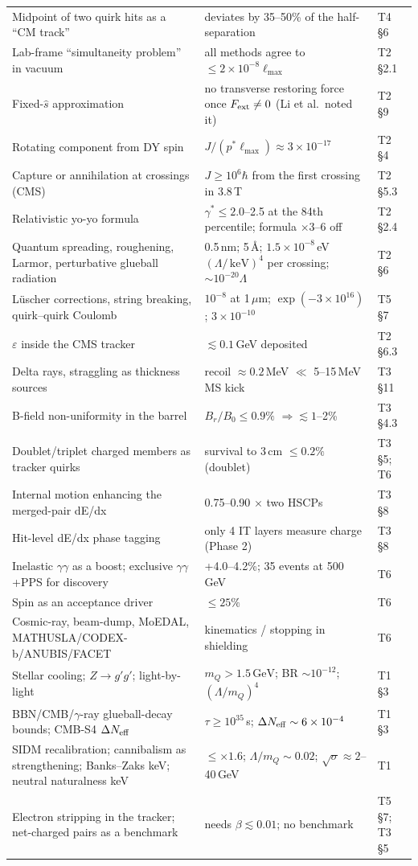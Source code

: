 \documentclass[11pt,a4paper]{article}
\newcommand{\mQ}{m_Q}
\newcommand{\GeV}{\ensuremath{\,\mathrm{GeV}}}
\newcommand{\keV}{\ensuremath{\,\mathrm{keV}}}
\newcommand{\um}{\ensuremath{\,\mu\mathrm{m}}}
\newcommand{\gst}{\gamma^*}
\newcommand{\lmax}{\ell_{\max}}
\newcommand{\sqs}{\sqrt{\sigma}}
\begin{document}
{\begin{longtable}{@{}L{5.6cm}L{7.6cm}L{3.0cm}@{}}
Midpoint of two quirk hits as a ``CM track'' & deviates by 35--50\% of the half-separation & T4 \S6\\
Lab-frame ``simultaneity problem'' in vacuum & all methods agree to $\le2\times10^{-8}\lmax$ & T2 \S2.1\\
Fixed-$\hat s$ approximation & no transverse restoring force once $F_{\rm ext}\ne0$ (Li et al.\ noted it) & T2 \S9\\
Rotating component from DY spin & $J/(p^*\lmax)\approx3\times10^{-17}$ & T2 \S4\\
Capture or annihilation at crossings (CMS) & $J\ge10^6\hbar$ from the first crossing in 3.8\,T & T2 \S5.3\\
Relativistic yo-yo formula & $\gst\le2.0$--2.5 at the 84th percentile; formula $\times3$--6 off & T2 \S2.4\\
Quantum spreading, roughening, Larmor, perturbative glueball radiation & 0.5\,nm; 5\,\AA; $1.5\times10^{-8}$\,eV$(\Lambda/\keV)^4$ per crossing; $\sim10^{-20}\Lambda$ & T2 \S6\\
L\"uscher corrections, string breaking, quirk--quirk Coulomb & $10^{-8}$ at 1\um; $\exp(-3\times10^{16})$; $3\times10^{-10}$ & T5 \S7\\
$\varepsilon$ inside the CMS tracker & $\lesssim0.1$\,GeV deposited & T2 \S6.3\\
Delta rays, straggling as thickness sources & recoil $\approx0.2$\,MeV $\ll$ 5--15\,MeV MS kick & T3 \S11\\
B-field non-uniformity in the barrel & $B_r/B_0\le0.9\%$ $\Rightarrow\lesssim1$--2\% & T3 \S4.3\\
Doublet/triplet charged members as tracker quirks & survival to 3\,cm $\le0.2\%$ (doublet) & T3 \S5; T6\\
Internal motion enhancing the merged-pair dE/dx & 0.75--0.90 $\times$ two HSCPs & T3 \S8\\
Hit-level dE/dx phase tagging & only 4 IT layers measure charge (Phase 2) & T3 \S8\\
Inelastic $\gamma\gamma$ as a boost; exclusive $\gamma\gamma$+PPS for discovery & +4.0--4.2\%; 35 events at 500\,GeV & T6\\
Spin as an acceptance driver & $\le25\%$ & T6\\
Cosmic-ray, beam-dump, MoEDAL, MATHUSLA/CODEX-b/ANUBIS/FACET & kinematics / stopping in shielding & T6\\
Stellar cooling; $Z\to g'g'$; light-by-light & $\mQ>1.5\GeV$; BR $\sim10^{-12}$; $(\Lambda/\mQ)^4$ & T1 \S3\\
BBN/CMB/$\gamma$-ray glueball-decay bounds; CMB-S4 $\Delta N_{\rm eff}$ & $\tau\ge10^{35}$\,s; $\Delta N_{\rm eff}\sim6\times10^{-4}$ & T1 \S3\\
SIDM recalibration; cannibalism as strengthening; Banks--Zaks keV; neutral naturalness keV & $\le\times1.6$; $\Lambda/\mQ\sim0.02$; $\sqs\approx2$--40\,GeV & T1\\
Electron stripping in the tracker; net-charged pairs as a benchmark & needs $\beta\lesssim0.01$; no benchmark & T5 \S7; T3 \S5\\
\end{longtable}
}
\end{document}
